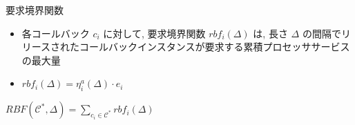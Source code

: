 
\begin{frame}{要求境界関数}
    \begin{definition}
        \setlength{\linewidth}{0.98\columnwidth}
        \begin{itemize}
            \item 各コールバック $c_{i}$ に対して, 要求境界関数 $rbf_{i}(\Delta)$ は, 長さ $\Delta$ の間隔でリリースされたコールバックインスタンスが要求する累積プロセッササービスの最大量
            \item $r b f_{i}(\Delta)=\eta_{i}^{a}(\Delta) \cdot e_{i}$
        \end{itemize}
    \end{definition}
    \begin{definition}
        $R B F\left(\mathcal{C}^{*}, \Delta\right)=\sum_{c_{i} \in \mathcal{C}^{*}} r b f_{i}(\Delta)$
    \end{definition}
\end{frame}



